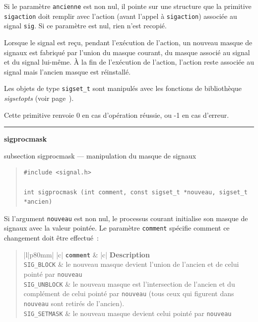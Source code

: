 \documentclass [twoside] {report}
\newcommand {\primitive} [1]
    {
	\phantomsection
	{\large \textbf {#1}}
	\addcontentsline {toc} {subsection} {#1}
    }
\newcommand {\separation}
    {
	\vspace {5mm}
	\nopagebreak
	\hrule
    }
\begin{document}
Si le paramètre \texttt {ancienne} est non nul, il pointe sur une structure
que la primitive \texttt {sigaction} doit remplir avec l'action (avant
l'appel à \texttt {sigaction}) associée au signal \texttt {sig}.  Si ce
paramètre est nul, rien n'est recopié.

Lorsque le signal est reçu, pendant l'exécution de l'action, un nouveau
masque de signaux est fabriqué par l'union du masque courant, du masque
associé au signal et du signal lui-même. \`A la fin de l'exécution de
l'action, l'action reste associée au signal mais l'ancien masque est
réinstallé.

Les objets de type \texttt {sigset\_t} sont manipulés avec les fonctions de
bibliothèque \emph {sigsetopts} (voir page~\pageref {sigsetopts}).

Cette primitive renvoie 0 en cas d'opération réussie, ou -1 en cas
d'erreur.



\separation
\primitive {sigprocmask} --- manipulation du masque de signaux
    \label {sigprocmask}

\begin {quote}
\begin {verbatim}
#include <signal.h>

int sigprocmask (int comment, const sigset_t *nouveau, sigset_t *ancien)
\end{verbatim}
\end {quote}

Si l'argument \texttt {nouveau} est non nul, le processus courant initialise
son masque de signaux avec la valeur pointée. Le paramètre \texttt {comment}
spécifie comment ce changement doit être effectué~:

\begin {quote}
\begin {tabular} {|l|p{80mm}|} \hline
     {|c|} {\texttt {\textbf {comment}}}
	&  {|c|} {\textbf {Description}}
	\\ \hline
    \verb:SIG_BLOCK:
	& le nouveau masque devient l'union de l'ancien et de celui pointé
	    par \texttt {nouveau}
	\\ \hline
    \verb:SIG_UNBLOCK:
	& le nouveau masque est l'intersection de l'ancien et du
	    complément de celui pointé par \texttt {nouveau} (tous ceux qui
	    figurent dans \texttt {nouveau} sont retirés de l'ancien).
	\\ \hline
    \verb:SIG_SETMASK:
	& le nouveau masque devient celui pointé par \texttt {nouveau}
	\\ \hline
\end {tabular}
\end {quote}
\end{document}
